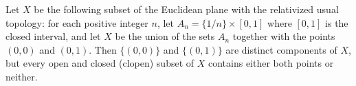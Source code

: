 Let $X$ be the following subset of the Euclidean plane with the relativized usual topology: for each positive integer $n$, let $A_n = \{1/n\} \times [0,1]$ where $[0,1]$ is the closed interval, and let $X$ be the union of the sets $A_n$ together with the points $(0,0)$ and $(0,1)$. Then $\{(0,0)\}$ and $\{(0,1)\}$ are distinct components of $X$, but every open and closed (clopen) subset of $X$ contains either both points or neither.
